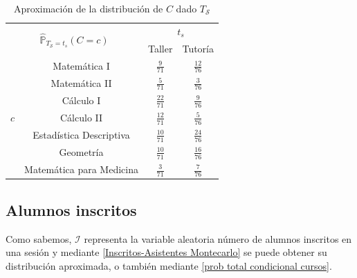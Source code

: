\documentclass[11pt,a4paper]{book}
\theoremstyle{definition}%
\newcommand{\Probsymb}{\mathds{P}}
\begin{document}
                \begin{table}[H]
                    \centering                    
                    \begin{tabular}{|c|c|c|c|}
                        \hline
                        \multicolumn{2}{|c|}{\multirow{2}{*}{$\hat{\Probsymb}_{T_\mathcal{S}=t_s}(C=c)$}} & \multicolumn{2}{c|}{$t_s$} \\ \cline{3-4}
                        \multicolumn{2}{|c|}{} & Taller & Tutoría \\ \hline
                        \multirow{7}{*}{$c$} & Matemática I & $\frac{9}{71}$ & $\frac{12}{76}$ \\ \cline{2-4}
                        & Matemática II & $\frac{5}{71}$ & $\frac{3}{76}$  \\ \cline{2-4}
                        & Cálculo I & $\frac{22}{71}$ & $\frac{9}{76}$  \\ \cline{2-4}
                        & Cálculo II & $\frac{12}{71}$ & $\frac{5}{76}$  \\ \cline{2-4}
                        & Estadística Descriptiva & $\frac{10}{71}$ & $\frac{24}{76}$  \\ \cline{2-4}
                        & Geometría & $\frac{10}{71}$ & $\frac{16}{76}$  \\ \cline{2-4}
                        & Matemática para Medicina & $\frac{3}{71}$ & $\frac{7}{76}$  \\ \hline
                    \end{tabular}                    
                    \caption{Aproximación de la distribución de $C$ dado $T_\mathcal{S}$}
                    \label{tab:distribucion_C_Ts}
                \end{table}
            \subsection{Alumnos inscritos}
                Como sabemos, $\mathcal{I}$ representa la variable aleatoria número de alumnos inscritos en una sesión y mediante \ref{Inscritos-Asistentes Montecarlo} se puede obtener su distribución aproximada, o también mediante \ref{prob total condicional cursos}.
                
\end{document}
